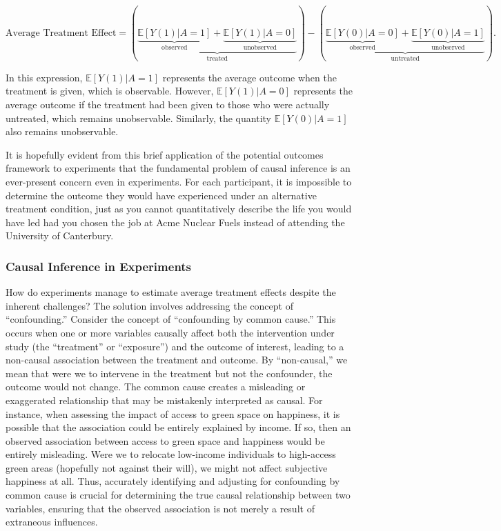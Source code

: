\documentclass[
  singlecolumn]{article}
\begin{document}
\[
\text{Average Treatment Effect} = \left(\underbrace{\underbrace{\mathbb{E}[Y(1)|A = 1]}_{\text{observed}} + \underbrace{\mathbb{E}[Y(1)|A = 0]}_{\text{unobserved}}}_{\text{treated}}\right) - \left(\underbrace{\underbrace{\mathbb{E}[Y(0)|A = 0]}_{\text{observed}} + \underbrace{\mathbb{E}[Y(0)|A = 1]}_{\text{unobserved}}}_{\text{untreated}}\right).
\]

In this expression, \(\mathbb{E}[Y(1)|A = 1]\) represents the average
outcome when the treatment is given, which is observable. However,
\(\mathbb{E}[Y(1)|A = 0]\) represents the average outcome if the
treatment had been given to those who were actually untreated, which
remains unobservable. Similarly, the quantity \(\mathbb{E}[Y(0)|A = 1]\)
also remains unobservable.

It is hopefully evident from this brief application of the potential
outcomes framework to experiments that the fundamental problem of causal
inference is an ever-present concern even in experiments. For each
participant, it is impossible to determine the outcome they would have
experienced under an alternative treatment condition, just as you cannot
quantitatively describe the life you would have led had you chosen the
job at Acme Nuclear Fuels instead of attending the University of
Canterbury.

\subsubsection{Causal Inference in
Experiments}\label{causal-inference-in-experiments}

How do experiments manage to estimate average treatment effects despite
the inherent challenges? The solution involves addressing the concept of
``confounding.'' Consider the concept of ``confounding by common
cause.'' This occurs when one or more variables causally affect both the
intervention under study (the ``treatment'' or ``exposure'') and the
outcome of interest, leading to a non-causal association between the
treatment and outcome. By ``non-causal,'' we mean that were we to
intervene in the treatment but not the confounder, the outcome would not
change. The common cause creates a misleading or exaggerated
relationship that may be mistakenly interpreted as causal. For instance,
when assessing the impact of access to green space on happiness, it is
possible that the association could be entirely explained by income. If
so, then an observed association between access to green space and
happiness would be entirely misleading. Were we to relocate low-income
individuals to high-access green areas (hopefully not against their
will), we might not affect subjective happiness at all. Thus, accurately
identifying and adjusting for confounding by common cause is crucial for
determining the true causal relationship between two variables, ensuring
that the observed association is not merely a result of extraneous
influences.
\end{document}
